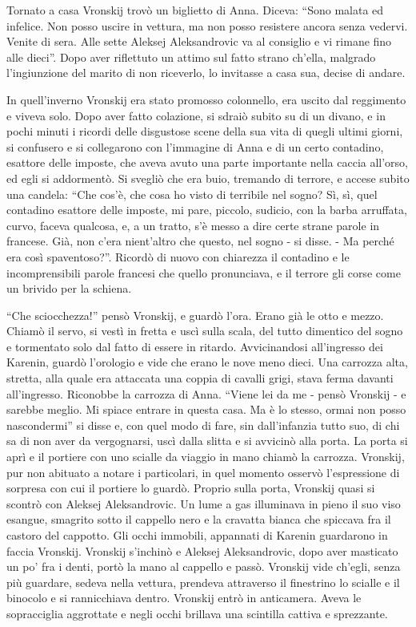 Tornato a casa Vronskij trovò un biglietto di Anna. Diceva: ``Sono malata ed infelice. Non posso uscire in vettura, ma non posso resistere ancora senza vedervi. Venite di sera. Alle sette Aleksej Aleksandrovic va al consiglio e vi rimane fino alle dieci''. Dopo aver riflettuto un attimo sul fatto strano ch'ella, malgrado l'ingiunzione del marito di non riceverlo, lo invitasse a casa sua, decise di andare. 

In quell'inverno Vronskij era stato promosso colonnello, era uscito dal reggimento e viveva solo. Dopo aver fatto colazione, si sdraiò subito su di un divano, e in pochi minuti i ricordi delle disgustose scene della sua vita di quegli ultimi giorni, si confusero e si collegarono con l'immagine di Anna e di un certo contadino, esattore delle imposte, che aveva avuto una parte importante nella caccia all'orso, ed egli si addormentò. Si svegliò che era buio, tremando di terrore, e accese subito una candela: ``Che cos'è, che cosa ho visto di terribile nel sogno? Sì, sì, quel contadino esattore delle imposte, mi pare, piccolo, sudicio, con la barba arruffata, curvo, faceva qualcosa, e, a un tratto, s'è messo a dire certe strane parole in francese. Già, non c'era nient'altro che questo, nel sogno - si disse. - Ma perché era così spaventoso?''. Ricordò di nuovo con chiarezza il contadino e le incomprensibili parole francesi che quello pronunciava, e il terrore gli corse come un brivido per la schiena. 

``Che sciocchezza!'' pensò Vronskij, e guardò l'ora. Erano già le otto e mezzo. Chiamò il servo, si vestì in fretta e uscì sulla scala, del tutto dimentico del sogno e tormentato solo dal fatto di essere in ritardo. Avvicinandosi all'ingresso dei Karenin, guardò l'orologio e vide che erano le nove meno dieci. Una carrozza alta, stretta, alla quale era attaccata una coppia di cavalli grigi, stava ferma davanti all'ingresso. Riconobbe la carrozza di Anna. ``Viene lei da me - pensò Vronskij - e sarebbe meglio. Mi spiace entrare in questa casa. Ma è lo stesso, ormai non posso nascondermi'' si disse e, con quel modo di fare, sin dall'infanzia tutto suo, di chi sa di non aver da vergognarsi, uscì dalla slitta e si avvicinò alla porta. La porta si aprì e il portiere con uno scialle da viaggio in mano chiamò la carrozza. Vronskij, pur non abituato a notare i particolari, in quel momento osservò l'espressione di sorpresa con cui il portiere lo guardò. Proprio sulla porta, Vronskij quasi si scontrò con Aleksej Aleksandrovic. Un lume a gas illuminava in pieno il suo viso esangue, smagrito sotto il cappello nero e la cravatta bianca che spiccava fra il castoro del cappotto. Gli occhi immobili, appannati di Karenin guardarono in faccia Vronskij. Vronskij s'inchinò e Aleksej Aleksandrovic, dopo aver masticato un po' fra i denti, portò la mano al cappello e passò. Vronskij vide ch'egli, senza più guardare, sedeva nella vettura, prendeva attraverso il finestrino lo scialle e il binocolo e si rannicchiava dentro. Vronskij entrò in anticamera. Aveva le sopracciglia aggrottate e negli occhi brillava una scintilla cattiva e sprezzante. 

